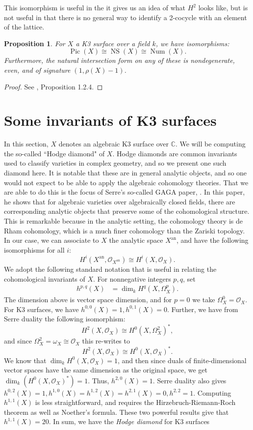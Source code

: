 \documentclass[12pt,twoside]{reedthesis}
\theoremstyle{plain}
\newtheorem{proposition}[theorem]{Proposition}
\theoremstyle{definition}
\theoremstyle{remark}
\newcommand{\CC}{\mathbb{C}}
\newcommand{\calO}{\mathcal{O}}
\newcommand{\Pic}{\operatorname{Pic}}
\newcommand{\NS}{\operatorname{NS}}
\newcommand{\Num}{\operatorname{Num}}
\begin{document}
\noindent This isomorphism is useful in the it gives us an idea of what $H^2$ looks like, but is not useful in that there is no general way to identify a 2-cocycle with an element of the lattice.
\begin{proposition}
For $X$ a K3 surface over a field $k$, we have isomorphisms:
\[
\Pic(X)\cong\NS(X)\cong\Num(X).
\]
Furthermore, the natural intersection form on any of these is nondegenerate, even, and of signature $(1,\rho(X)-1)$.
\end{proposition}
\begin{proof}
See \cite{huybrechts}, Proposition 1.2.4.
\end{proof}

\section{Some invariants of K3 surfaces}
In this section, $X$ denotes an algebraic K3 surface over $\CC$. We will be computing the so-called ``Hodge diamond" of $X$. Hodge diamonds are common invariants used to classify varieties in complex geometry, and so we present one such diamond here. It is notable that these are in general analytic objects, and so one would not expect to be able to apply the algebraic cohomology theories. That we are able to do this is the focus of Serre's so-called GAGA paper, \cite{gaga}. In this paper, he shows that for algebraic varieties over algebraically closed fields, there are corresponding analytic objects that preserve some of the cohomological structure. This is remarkable because in the analytic setting, the cohomology theory is de Rham cohomology, which is a much finer cohomology than the Zariski topology. In our case, we can associate to $X$ the analytic space $X^{\text{an}}$, and have the following isomorphisms for all $i$:
\[
H^i(X^{\text{an}},\calO_{X^{\text{an}}})\cong H^i(X,\calO_X).
\] We adopt the following standard notation that is useful in relating the cohomological invariants of $X$. For nonnegative integers $p,q$, set
\begin{align*}
h^{p,q}(X)&=\dim_k H^q(X,\Omega_X^p).
\end{align*}
\noindent The dimension above is vector space dimension, and for $p=0$ we take $\Omega_X^0=\calO_X$. For K3 surfaces, we have $h^{0,0}(X)=1, h^{0,1}(X)=0.$ Further, we have from Serre duality the following isomorphism:
\[
H^2(X,\calO_X)\cong H^0(X,\Omega_X^2)^*,
\]
and since $\Omega_X^2=\omega_X\cong\calO_X$ this re-writes to
\[
H^2(X,\calO_X)\cong H^0(X,\calO_X)^*.
\]
We know that $\dim_kH^0(X,\calO_X)=1$, and then since duals of finite-dimensional vector spaces have the same dimension as the original space, we get $\dim_k( H^0(X,\calO_X)^*)=1$. Thus, $h^{2,0}(X)=1$. Serre duality also gives $h^{0,2}(X)=1, h^{1,0}(X)=h^{1,2}(X)=h^{2,1}(X)=0, h^{2,2}=1$. Computing $h^{1,1}(X)$ is less straightforward, and requires the Hirzebruch-Riemann-Roch theorem as well as Noether's formula. These two powerful results give that $h^{1,1}(X)=20$. In sum, we have the \emph{Hodge diamond} for K3 surfaces
\end{document}
